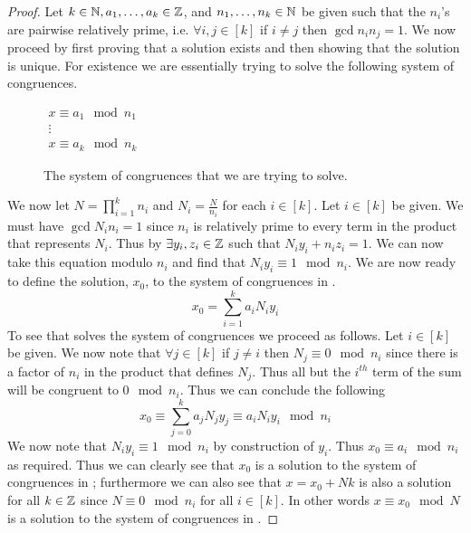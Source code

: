         \begin{proof}
            Let $k \in \mathbb{N}, a_1, \dots, a_k \in \mathbb{Z}$, and $n_1, \dots, n_k \in \mathbb{N}$ 
            be given such that the $n_i$'s are pairwise relatively prime, i.e. $\forall i, j \in [k]$
            if $i \neq j$ then $\gcd{n_i}{n_j} = 1$. We now proceed by first proving that a 
            solution exists and then showing that the solution is unique. For existence we
            are essentially trying to solve the following system of congruences. 
            \begin{figure}[H]
                \centering
                $\begin{array}{c}
                    x \equiv a_1 \mod n_1 \\
                    \vdots \\
                    x \equiv a_k \mod n_k
                \end{array}$
                \caption{The system of congruences that we are trying to solve.}
                \label{CRT congruences}
            \end{figure}
            We now let $N = \prod_{i = 1}^{k} n_i$ and $N_i = \frac{N}{n_i}$ for each $i \in [k]$. 
            Let $i \in [k]$ be given. We must have $\gcd{N_i}{n_i} = 1$ since $n_i$ is relatively
            prime to every term in the product that represents $N_i$. Thus by
             $\exists y_i, z_i \in \mathbb{Z}$ such that
            $N_iy_i + n_iz_i = 1$. We can now take this equation modulo $n_i$ and 
            find that $N_iy_i \equiv 1 \mod n_i$. We are now ready to define the solution, $x_0$,
            to the system of congruences in .
            \begin{equation}
                x_0 = \sum_{i = 1}^{k} a_iN_iy_i
                \label{CRT solution}
            \end{equation}
            To see that  solves the system of congruences we proceed
            as follows. Let $i \in [k]$ be given. We now note that $\forall j \in [k]$ if
            $j \neq i$ then $N_j \equiv 0 \mod n_i$ since there is a factor of $n_i$ in the product
            that defines $N_j$. Thus all but the $i^{th}$ term of the sum will be congruent to $0
            \mod n_i$. Thus we can conclude the following
            \[
                x_0 \equiv \sum_{j = 0}^{k} a_jN_jy_j \equiv a_iN_iy_i\mod n_i
            \]
            We now note that $N_iy_i \equiv 1 \mod n_i$ by
            construction of $y_i$. Thus $x_0 \equiv a_i \mod n_i$ as required. Thus we can
            clearly see that $x_0$ is a solution to the system of congruences
            in ; furthermore we can also see that
            $x = x_0 + Nk$ is also a solution for all $k \in \mathbb{Z}$ since $N \equiv 0 \mod n_i$
            for all $i \in [k]$.
            In other words $x \equiv x_0 \mod N$ is a solution to the system of
            congruences in .


\end{proof}
